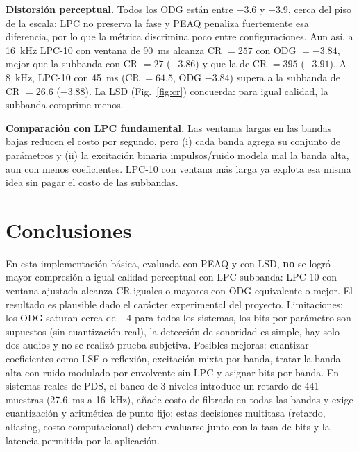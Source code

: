 \documentclass[10pt,twocolumn]{article}
\begin{document}
\textbf{Distorsi\'on perceptual.} Todos los ODG est\'an entre $-3.6$ y $-3.9$, cerca del piso de la escala: LPC no preserva la fase y PEAQ penaliza fuertemente esa diferencia, por lo que la m\'etrica discrimina poco entre configuraciones. Aun as\'i, a 16~kHz LPC-10 con ventana de 90~ms alcanza CR $=257$ con ODG $=-3.84$, mejor que la subbanda con CR $=27$ ($-3.86$) y que la de CR $=395$ ($-3.91$). A 8~kHz, LPC-10 con 45~ms (CR $=64.5$, ODG $-3.84$) supera a la subbanda de CR $=26.6$ ($-3.88$). La LSD (Fig.~\ref{fig:cr}) concuerda: para igual calidad, la subbanda comprime menos.

\textbf{Comparaci\'on con LPC fundamental.} Las ventanas largas en las bandas bajas reducen el costo por segundo, pero (i) cada banda agrega su conjunto de par\'ametros y (ii) la excitaci\'on binaria impulsos/ruido modela mal la banda alta, aun con menos coeficientes. LPC-10 con ventana m\'as larga ya explota esa misma idea sin pagar el costo de las subbandas.

\section{Conclusiones}
En esta implementaci\'on b\'asica, evaluada con PEAQ y con LSD, \textbf{no} se logr\'o mayor compresi\'on a igual calidad perceptual con LPC subbanda: LPC-10 con ventana ajustada alcanza CR iguales o mayores con ODG equivalente o mejor. El resultado es plausible dado el car\'acter experimental del proyecto. Limitaciones: los ODG saturan cerca de $-4$ para todos los sistemas, los bits por par\'ametro son supuestos (sin cuantizaci\'on real), la detecci\'on de sonoridad es simple, hay solo dos audios y no se realiz\'o prueba subjetiva. Posibles mejoras: cuantizar coeficientes como LSF o reflexi\'on, excitaci\'on mixta por banda, tratar la banda alta con ruido modulado por envolvente sin LPC y asignar bits por banda. En sistemas reales de PDS, el banco de 3 niveles introduce un retardo de 441 muestras (27.6~ms a 16~kHz), a\~nade costo de filtrado en todas las bandas y exige cuantizaci\'on y aritm\'etica de punto fijo; estas decisiones multitasa (retardo, aliasing, costo computacional) deben evaluarse junto con la tasa de bits y la latencia permitida por la aplicaci\'on.
\end{document}
